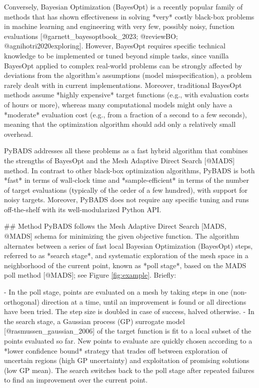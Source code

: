 \documentclass{article}
\begin{document}
\begin{markdown}
Conversely, Bayesian Optimization (BayesOpt) is a recently popular family of methods that has shown effectiveness in solving *very* costly black-box problems in machine learning and engineering with very few, possibly noisy, function evaluations [@garnett_bayesoptbook_2023; @reviewBO; @agnihotri2020exploring]. However, BayesOpt requires specific technical knowledge to be implemented or tuned beyond simple tasks, since vanilla BayesOpt applied to complex real-world problems can be strongly affected by deviations from the algorithm's assumptions (model misspecification), a problem rarely dealt with in current implementations. Moreover, traditional BayesOpt methods assume *highly expensive* target functions (e.g., with evaluation costs of hours or more), whereas many computational models might only have a *moderate* evaluation cost (e.g., from a fraction of a second to a few seconds), meaning that the optimization algorithm should add only a relatively small overhead. 

PyBADS addresses all these problems as a fast hybrid algorithm that combines the strengths of BayesOpt and the Mesh Adaptive Direct Search [@MADS] method. In contrast to other black-box optimization algorithms, PyBADS is both *fast* in terms of wall-clock time and *sample-efficient* in terms of the number of target evaluations (typically of the order of a few hundred), with support for noisy targets. Moreover, PyBADS does not require any specific tuning and runs off-the-shelf with its well-modularized Python API.

## Method
PyBADS follows the Mesh Adaptive Direct Search [MADS, @MADS] schema for minimizing the given objective function. The algorithm alternates between a series of fast local Bayesian Optimization (BayesOpt) steps, referred to as *search stage*, and systematic exploration of the mesh space in a neighborhood of the current point, known as *poll stage*, based on the MADS poll method [@MADS]; see Figure \ref{fig:example}.
Briefly:

  - In the poll stage, points are evaluated on a mesh by taking steps in one (non-orthogonal) direction at a time, until an improvement is found or all directions have been tried. The step size is doubled in case of success, halved otherwise.
  - In the search stage, a Gaussian process (GP) surrogate model [@rasmussen_gaussian_2006] of the target function is fit to a local subset of the points evaluated so far. New points to evaluate are quickly chosen according to a *lower confidence bound* strategy that trades off between exploration of uncertain regions (high GP uncertainty) and exploitation of promising solutions (low GP mean). The search switches back to the poll stage after repeated failures to find an improvement over the current point.


\end{markdown}
\end{document}
